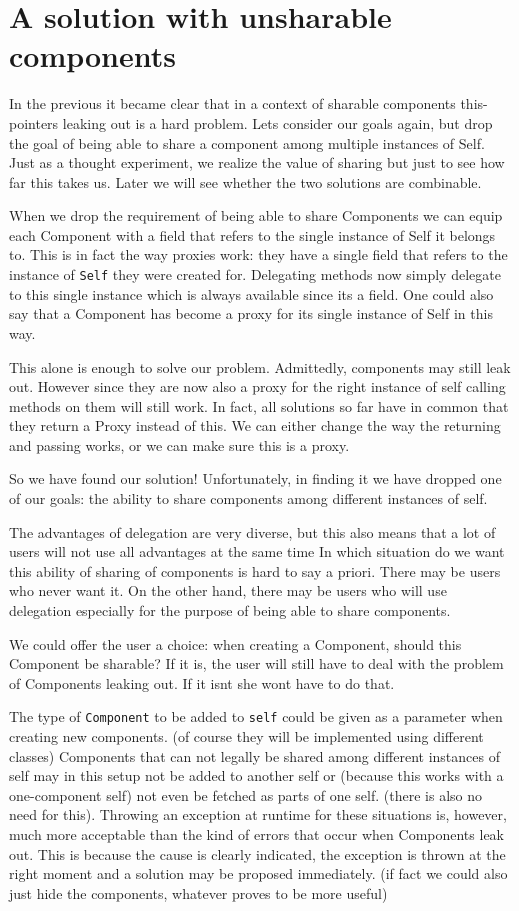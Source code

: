 \documentclass[a4paper,12pt]{book}
\begin{document}
\section*{A solution with unsharable components}
In the previous it became clear that in a context of sharable components this-pointers leaking out is a hard problem. Lets consider our goals again, but drop the goal of being able to share a component among multiple instances of Self. Just as a thought experiment, we realize the value of sharing but just to see how far this takes us. Later we will see whether the two solutions are combinable.

When we drop the requirement of being able to share Components we can equip each Component with a field that refers to the single instance of Self it belongs to. This is in fact the way proxies work: they have a single field that refers to the instance of \verb|Self| they were created for. Delegating methods now simply delegate to this single instance which is always available since its a field. One could also say that a Component has become a proxy for its single instance of Self in this way.

This alone is enough to solve our problem. Admittedly, components may still leak out. However since they are now also a proxy for the right instance of self calling methods on them will still work. In fact, all solutions so far have in common that they return a Proxy instead of this. We can either change the way the returning and passing works, or we can make sure this is a proxy.

So we have found our solution! Unfortunately, in finding it we have dropped one of our goals: the ability to share components among different instances of self.

The advantages of delegation are very diverse, but this also means that a lot of users will not use all advantages at the same time In which situation do we want this ability of sharing of components is hard to say a priori. There may be users who never want it. On the other hand, there may be users who will use delegation especially for the purpose of being able to share components.

We could offer the user a choice: when creating a Component, should this Component be sharable? If it is, the user will still have to deal with the problem of Components leaking out. If it isnt she wont have to do that. 

The type of \verb|Component| to be added to \verb|self| could be given as a parameter when creating new components. (of course they will be implemented using different classes) Components that can not legally be shared among different instances of self may in this setup not be added to another self or (because this works with a one-component self) not even be fetched as parts of one self. (there is also no need for this). Throwing an exception at runtime for these situations is, however, much more acceptable than the kind of errors that occur when Components leak out. This is because the cause is clearly indicated, the exception is thrown at the right moment and a solution may be proposed immediately. (if fact we could also just hide the components, whatever proves to be more useful)
\end{document}
